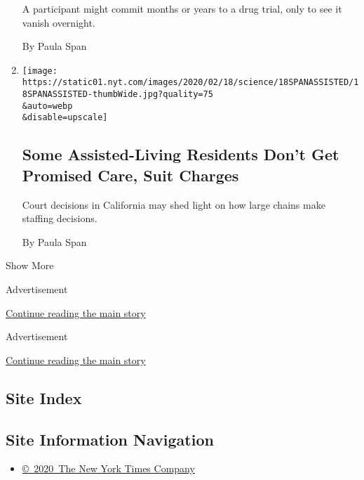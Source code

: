 \begin{enumerate}
  A participant might commit months or years to a drug trial, only to
  see it vanish overnight.

  By Paula Span
\item
  \href{/2020/02/14/health/assisted-living-staffing.html}{}

  \texttt{[image: https://static01.nyt.com/images/2020/02/18/science/18SPANASSISTED/18SPANASSISTED-thumbWide.jpg?quality=75\\\&auto=webp\\\&disable=upscale]}

  \hypertarget{some-assisted-living-residents-dont-get-promised-care-suit-charges}{%
  \subsection{Some Assisted-Living Residents Don't Get Promised Care,
  Suit
  Charges}\label{some-assisted-living-residents-dont-get-promised-care-suit-charges}}

  Court decisions in California may shed light on how large chains make
  staffing decisions.

  By Paula Span
\end{enumerate}

Show More

Advertisement

\protect\hyperlink{after-mid1}{Continue reading the main story}

Advertisement

\protect\hyperlink{after-mktg}{Continue reading the main story}

\hypertarget{site-index}{%
\subsection{Site Index}\label{site-index}}

\hypertarget{site-information-navigation}{%
\subsection{Site Information
Navigation}\label{site-information-navigation}}

\begin{itemize}
\tightlist
\item
  \href{https://help.nytimes.com/hc/en-us/articles/115014792127-Copyright-notice}{©~2020~The
  New York Times Company}
\end{itemize}

